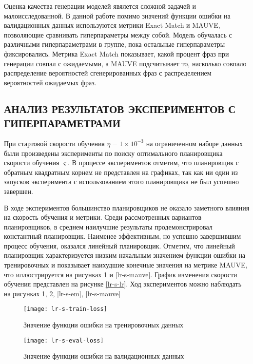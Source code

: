 Оценка качества генерации моделей явялется сложной задачей и малоисследованной. В данной работе помимо значений функции ошибки на валидационных данных используются метрики Exact Match и MAUVE, позволяющие сравнивать гиперпараметры между собой. Модель обучалась с различными гиперпараметрами в группе, пока остальные гиперпараметры фиксировались.
Метрика Exact Match показывает, какой процент фраз при генерации совпал с ожидаемыми, а MAUVE подсчитывает то, насколько совпало распределение вероятностей сгенерированных фраз с распределением вероятностей ожидаемых фраз.

\subsection{АНАЛИЗ РЕЗУЛЬТАТОВ ЭКСПЕРИМЕНТОВ С ГИПЕРПАРАМЕТРАМИ}

При стартовой скорости обучения $\eta = 1 \times 10^{-3}$ на ограниченном наборе данных были произведены эксперименты по поиску оптимального планировщика скорости обучения $\varsigma$. В процессе экспериментов отметим, что планировщик с обратным квадратным корнем не представлен на графиках, так как ни один из запусков эксперимента с использованием этого планировщика не был успешно завершен.

В ходе экспериментов большинство планировщиков не оказало заметного влияния на скорость обучения и метрики. Среди рассмотренных вариантов планировщиков, в среднем наилучшие результаты продемонстрировал константный планировщик. Наименее эффективным, но успешно завершившим процесс обучения, оказался линейный планировщик. Отметим, что линейный планировщик характеризуется низким начальным значением функции ошибки на тренировочных и показывает наихудшие конечные значения на метрике MAUVE, что иллюстрируется на рисунках \ref{lr-s-train-loss} и \ref{lr-s-mauve}. График изменения скорости обучения представлен на рисунке \ref{lr-s-lr}. Ход экспериментов можно наблюдать на рисунках \ref{lr-s-train-loss}, \ref{lr-s-eval-loss}, \ref{lr-s-em}, \ref{lr-s-mauve}

\begin{figure}[H]
  \centering
  \texttt{[image: lr-s-train-loss]}
  \caption{Значение функции ошибки на тренировочных данных}
  \label{lr-s-train-loss}
\end{figure}

\begin{figure}[H]
  \centering
  \texttt{[image: lr-s-eval-loss]}
  \caption{Значение функции ошибки на валидационных данных}
  \label{lr-s-eval-loss}
\end{figure}

